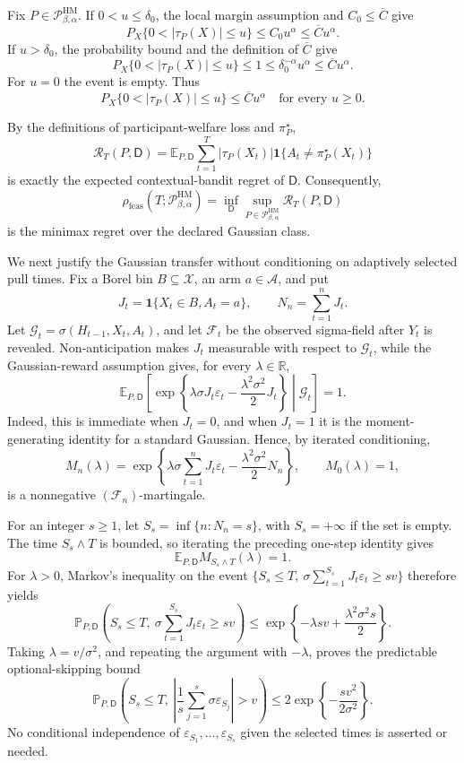 Fix \(P\in\mathcal P_{\beta,\alpha}^{\mathrm{HM}}\).  If \(0<u\leq\delta_0\), the local margin assumption and \(C_0\leq\overline C\) give
\[
 P_X\{0<|\tau_P(X)|\leq u\}\leq C_0u^\alpha
 \leq\overline C u^\alpha.
\]
If \(u>\delta_0\), the probability bound and the definition of \(\overline C\) give
\[
 P_X\{0<|\tau_P(X)|\leq u\}\leq1
 \leq\delta_0^{-\alpha}u^\alpha
 \leq\overline C u^\alpha.
\]
For \(u=0\) the event is empty.  Thus
\[
 P_X\{0<|\tau_P(X)|\leq u\}\leq\overline C u^\alpha
 \quad\text{for every }u\geq0.
\]

By the definitions of participant-welfare loss and \(\pi_P^\star\),
\[
 \mathcal R_T(P,\mathsf D)
 =\mathbb E_{P,\mathsf D}\sum_{t=1}^T
 |\tau_P(X_t)|\mathbf 1\{A_t\ne\pi_P^\star(X_t)\}
\]
is exactly the expected contextual-bandit regret of \(\mathsf D\).  Consequently,
\[
 \rho_{\mathrm{feas}}(T;\mathcal P_{\beta,\alpha}^{\mathrm{HM}})
 =\inf_{\mathsf D}\sup_{P\in\mathcal P_{\beta,\alpha}^{\mathrm{HM}}}
 \mathcal R_T(P,\mathsf D)
\]
is the minimax regret over the declared Gaussian class.

We next justify the Gaussian transfer without conditioning on adaptively selected pull times.  Fix a Borel bin \(B\subseteq\mathcal X\), an arm \(a\in\mathcal A\), and put
\[
 J_t=\mathbf 1\{X_t\in B,A_t=a\},
 \qquad N_n=\sum_{t=1}^nJ_t.
\]
Let \(\mathcal G_t=\sigma(H_{t-1},X_t,A_t)\), and let \(\mathcal F_t\) be the observed sigma-field after \(Y_t\) is revealed.  Non-anticipation makes \(J_t\) measurable with respect to \(\mathcal G_t\), while the Gaussian-reward assumption gives, for every \(\lambda\in\mathbb R\),
\[
 \mathbb E_{P,\mathsf D}\!\left[
  \exp\!\left\{\lambda\sigma J_t\varepsilon_t
  -\frac{\lambda^2\sigma^2}{2}J_t\right\}
  \middle|\mathcal G_t\right]=1.
\]
Indeed, this is immediate when \(J_t=0\), and when \(J_t=1\) it is the moment-generating identity for a standard Gaussian.  Hence, by iterated conditioning,
\[
 M_n(\lambda)=\exp\!\left\{
 \lambda\sigma\sum_{t=1}^nJ_t\varepsilon_t
 -\frac{\lambda^2\sigma^2}{2}N_n\right\},
 \qquad M_0(\lambda)=1,
\]
is a nonnegative \((\mathcal F_n)\)-martingale.

For an integer \(s\geq1\), let \(S_s=\inf\{n:N_n=s\}\), with \(S_s=+\infty\) if the set is empty.  The time \(S_s\wedge T\) is bounded, so iterating the preceding one-step identity gives
\[
 \mathbb E_{P,\mathsf D}M_{S_s\wedge T}(\lambda)=1.
\]
For \(\lambda>0\), Markov's inequality on the event \(\{S_s\leq T,\ \sigma\sum_{t=1}^{S_s}J_t\varepsilon_t\geq sv\}\) therefore yields
\[
 \mathbb P_{P,\mathsf D}\!\left(
 S_s\leq T,\ \sigma\sum_{t=1}^{S_s}J_t\varepsilon_t\geq sv
 \right)
 \leq\exp\!\left\{-\lambda sv+\frac{\lambda^2\sigma^2s}{2}\right\}.
\]
Taking \(\lambda=v/\sigma^2\), and repeating the argument with \(-\lambda\), proves the predictable optional-skipping bound
\[
 \mathbb P_{P,\mathsf D}\!\left(
 S_s\leq T,\ 
 \left|\frac1s\sum_{j=1}^s\sigma\varepsilon_{S_j}\right|>v
 \right)
 \leq2\exp\!\left\{-\frac{sv^2}{2\sigma^2}\right\}.
\]
No conditional independence of \(\varepsilon_{S_1},\ldots,\varepsilon_{S_s}\) given the selected times is asserted or needed.

